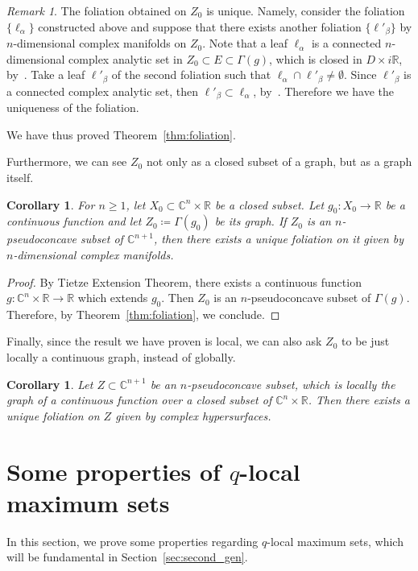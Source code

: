 \documentclass[reqno,oneside]{amsart}
\newcommand{\numberset}{\mathbb}
\newcommand{\R}{\numberset{R}}
\newcommand{\C}{\numberset{C}}
\theoremstyle{definition}
\theoremstyle{plain}
\newtheorem{corollary}[definition]{Corollary}
\theoremstyle{remark}
\newtheorem{remark}[definition]{Remark}
\begin{document}
\begin{remark}
	The foliation obtained on $Z_0$ is unique. Namely, consider the foliation $\{\ell_\alpha\}$ constructed above and suppose that there exists another foliation $\{\ell'_\beta\}$ by $n$-dimensional complex manifolds on $Z_0$. Note that a leaf $\ell_\alpha$ is a connected $n$-dimensional complex analytic set in $Z_0\subset E\subset\Gamma(g)$, which is closed in $D\times i\R$, by~\cite[Theorem~2]{chirka:trepreau_theorem}. Take a leaf $\ell'_\beta$ of the second foliation such that $\ell_\alpha\cap\ell'_\beta\neq\emptyset$. Since $\ell'_\beta$ is a connected complex analytic set, then $\ell'_\beta\subset\ell_\alpha$, by~\cite[Lemma~2]{chirka:trepreau_theorem}. Therefore we have the uniqueness of the foliation.
\end{remark}

We have thus proved Theorem~\ref{thm:foliation}. 

Furthermore, we can see $Z_0$ not only as a closed subset of a graph, but as a graph itself.
\begin{corollary}
\label{coro:foliation}
	For $n\geq1$, let $X_0\subset\C^n\times\R$ be a closed subset. Let $g_0:X_0\to\R$ be a continuous function and let $Z_0\coloneqq\Gamma(g_0)$ be its graph. If $Z_0$ is an $n$-pseudoconcave subset of $\C^{n+1}$, then there exists a unique foliation on it given by $n$-dimensional complex manifolds.
\end{corollary}
\begin{proof}
	By Tietze Extension Theorem, there exists a continuous function $g:\C^n\times\R\to\R$ which extends $g_0$. Then $Z_0$ is an $n$-pseudoconcave subset of $\Gamma(g)$. Therefore, by Theorem~\ref{thm:foliation}, we conclude.
\end{proof}

Finally, since the result we have proven is local, we can also ask $Z_0$ to be just locally a continuous graph, instead of globally.
\begin{corollary}
\label{coro:foliation2}
	Let $Z\subset\C^{n+1}$ be an $n$-pseudoconcave subset, which is locally the graph of a continuous function over a closed subset of $\C^n\times\R$. Then there exists a unique foliation on $Z$ given by complex hypersurfaces.
\end{corollary}


\section{Some properties of \texorpdfstring{$q$}{q}-local maximum sets}
\label{sec:locmax_set}
In this section, we prove some properties regarding $q$-local maximum sets, which will be fundamental in Section~\ref{sec:second_gen}.
\end{document}
